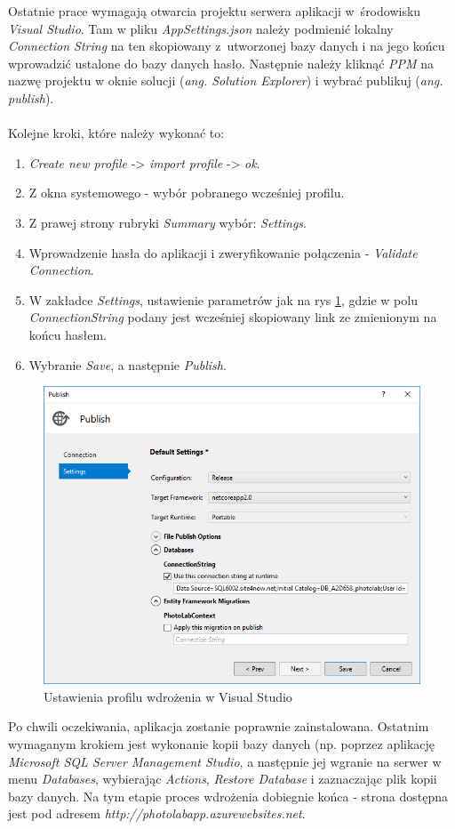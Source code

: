 \noindent Ostatnie prace wymagają otwarcia projektu serwera aplikacji w~środowisku \textit{Visual Studio}. Tam w pliku \textit{AppSettings.json} należy podmienić lokalny \textit{Connection String} na ten skopiowany z~utworzonej bazy danych i na jego końcu wprowadzić ustalone do bazy danych hasło. Następnie należy kliknąć \textit{PPM} na nazwę projektu w oknie solucji (\textit{ang. Solution Explorer}) i wybrać publikuj (\textit{ang. publish}).\\
\\
\noindent Kolejne kroki, które należy wykonać to:
 \begin{enumerate}
     \item \textit{Create new profile} -> \textit{import profile} -> \textit{ok}.
     \item Z okna systemowego - wybór pobranego wcześniej profilu.
     \item Z prawej strony rubryki \textit{Summary} wybór: \textit{Settings}.
     \item Wprowadzenie hasła do aplikacji i zweryfikowanie połączenia - \textit{Validate Connection}.
     \item W zakładce \textit{Settings}, ustawienie parametrów jak na rys \ref{fig:server-visual-deploy}, gdzie w polu \textit{ConnectionString} podany jest wcześniej skopiowany link ze zmienionym na końcu hasłem.
     \item Wybranie \textit{Save}, a następnie \textit{Publish}.
 \end{enumerate}
 
 
   \begin{figure}[ht]
	\centering
\includegraphics[width=0.7\linewidth]{graphics/chapter-4/server-visual-deploy.png}
\caption{Ustawienia profilu wdrożenia w Visual Studio}
\label{fig:server-visual-deploy}
\end{figure}     
\noindent Po chwili oczekiwania, aplikacja zostanie poprawnie zainstalowana.
Ostatnim wymaganym krokiem jest wykonanie kopii bazy danych (np. poprzez aplikację \textit{Microsoft SQL Server Management Studio}, a następnie jej wgranie na serwer w menu \textit{Databases}, wybierając \textit{Actions}, \textit{Restore Database} i zaznaczając plik kopii bazy danych. Na tym etapie proces wdrożenia dobiegnie końca - strona dostępna jest pod adresem \textit{http://photolabapp.azurewebsites.net}.
\newpage

